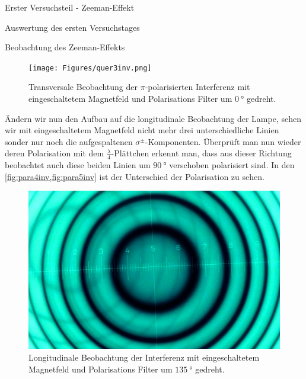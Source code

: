 \documentclass[pdftex, a4paper,11pt, twoside, ngerman]{report}
\begin{document}
\begin{chapter}{Erster Versuchsteil - Zeeman-Effekt}
\begin{section}{Auswertung des ersten Versuchstages}
\begin{subsection}{Beobachtung des Zeeman-Effekts}
\begin{figure}[ht]
\begin{minipage}{0.48\textwidth}
            \centering
            \texttt{[image: Figures/quer3inv.png]}
            \caption{Transversale Beobachtung der $\pi$-polarisierten
                Interferenz mit eingeschaltetem Magnetfeld und Polarisations
                Filter um $\SI{0}{\degree}$ gedreht.}
            \label{fig:quer3inv}
          \end{minipage}
        \end{figure}
        \newline
        Ändern wir nun den Aufbau auf die longitudinale Beobachtung der Lampe,
        sehen wir mit eingeschaltetem Magnetfeld nicht mehr drei
        unterschiedliche Linien sonder nur noch die aufgespaltenen
        $\sigma^{\pm}$-Komponenten. Überprüft man nun wieder deren Polarisation
        mit dem $\frac{\lambda}{4}$-Plättchen erkennt man, dass aus dieser
        Richtung beobachtet auch diese beiden Linien um $\SI{90}{\degree}$
        verschoben polarisiert sind. In den \cref{fig:para4inv,fig:para5inv}
        ist der Unterschied der Polarisation zu sehen.
        \begin{figure}[b!]
          \centering
          \begin{minipage}{0.48\textwidth}
            \centering
            \includegraphics[width=\textwidth]
                {Figures/parallel4inv.png}
            \caption{Longitudinale Beobachtung der Interferenz mit 
                eingeschaltetem Magnetfeld und Polarisations Filter um
                $\SI{135}{\degree}$ gedreht.}
            \label{fig:para4inv}
          \end{minipage}\quad
          \begin{minipage}{0.48\textwidth}
            \centering

\end{minipage}
\end{figure}
\end{subsection}
\end{section}
\end{chapter}
\end{document}
